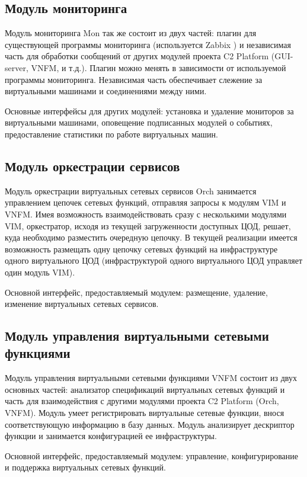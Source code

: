 \documentclass[oneside,final,14pt,a4paper]{extreport}
\begin{document}
\subsection{Модуль мониторинга}
Модуль мониторинга Mon так же состоит из двух частей: плагин для существующей программы мониторинга (используется Zabbix \cite{bib:zabbix}) и независимая часть для обработки сообщений от других модулей проекта C2 Platform (GUI-server, VNFM, и т.д.). Плагин можно менять в зависимости от используемой программы мониторинга. Независимая часть обеспечивает слежение за виртуальными машинами и соединениями между ними.

Основные интерфейсы для других модулей: установка и удаление мониторов за виртуальными машинами, оповещение подписанных модулей о событиях, предоставление статистики по работе виртуальных машин.

\subsection{Модуль оркестрации сервисов}
Модуль оркестрации виртуальных сетевых сервисов Orch занимается управлением цепочек сетевых функций, отправляя запросы к модулям VIM и VNFM. Имея возможность взаимодействовать сразу с несколькими модулями VIM, оркестратор, исходя из текущей загруженности доступных ЦОД, решает, куда необходимо разместить очередную цепочку. В текущей реализации имеется возможность размещать одну цепочку сетевых функций на инфраструктуре одного виртуального ЦОД (инфраструктурой одного виртуального ЦОД управляет один модуль VIM).

Основной интерфейс, предоставляемый модулем: размещение, удаление, изменение виртуальных сетевых сервисов.

\subsection{Модуль управления виртуальными сетевыми функциями}
Модуль управления виртуальными сетевыми функциями VNFM состоит из двух основных частей: анализатор спецификаций виртуальных сетевых функций и часть для взаимодействия с другими модулями проекта C2 Platform (Orch, VNFM). Модуль умеет регистрировать виртуальные сетевые функции, внося соответствующую информацию в базу данных. Модуль анализирует дескриптор функции и занимается конфигурацией ее инфраструктуры.

Основной интерфейс, предоставляемый модулем: управление, конфигурирование и поддержка виртуальных сетевых функций.
\end{document}
